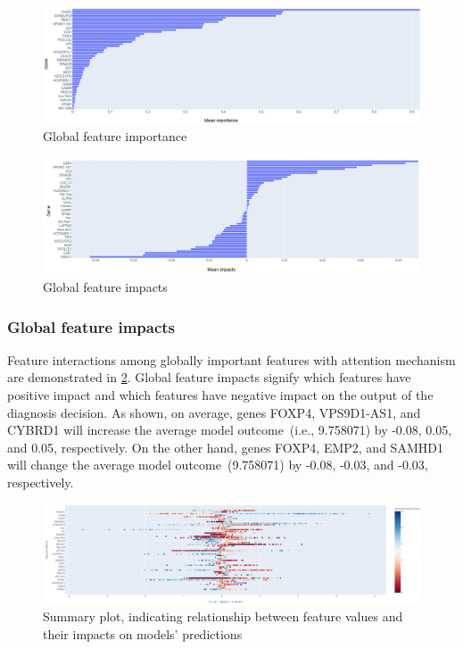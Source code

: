 \begin{figure}
    \centering
	\includegraphics[scale=0.9]{images/global_fi_1.png}
	\caption{Global feature importance}
    \label{fig:global_feature_importance}
\end{figure}

\begin{figure}
    \centering
	\includegraphics[scale=0.9]{images/global_fi_2.png}
	\caption{Global feature impacts}
    \label{fig:global_feature_impacts}
\end{figure}

\subsubsection{Global feature impacts}
Feature interactions among globally important features with attention mechanism are demonstrated in \cref{fig:global_feature_impacts}. Global feature impacts signify which features have positive impact and which features have negative impact on the output of the diagnosis decision. As shown, on average, genes FOXP4, VPS9D1-AS1, and CYBRD1 will increase the average model outcome~(i.e., 9.758071) by -0.08, 0.05, and 0.05, respectively. On the other hand, genes FOXP4, EMP2, and SAMHD1 will change the average model outcome~(9.758071) by -0.08, -0.03, and -0.03, respectively. 

\begin{figure}
    \centering
	\includegraphics[scale=0.6]{images/summary_plot.png}
	\caption{Summary plot, indicating relationship between feature values and their impacts on models' predictions}
    \label{fig:local_feature_impacts5}
\end{figure}

